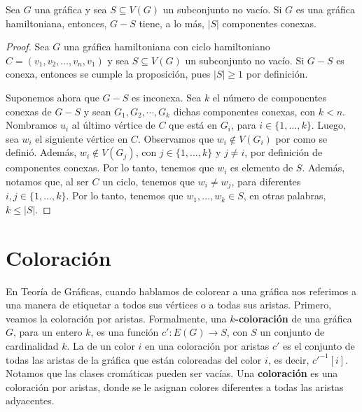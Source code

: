\begin{proposicion}
\label{prop:hamilt}
   Sea $G$ una gr\'afica y sea $S \subseteq V(G)$ un subconjunto no vac\'io. Si
    $G$ es una gr\'afica hamiltoniana, entonces, $G-S$ tiene, a lo m\'as, $|S|$
    componentes conexas.
\end{proposicion}


\begin{proof}
    Sea $G$ una gr\'afica hamiltoniana con ciclo hamiltoniano $C= (v_1, v_2,
    \dots, v_n, v_1)$ y sea $S \subseteq V(G)$ un subconjunto no vac\'io. Si
    $G-S$ es conexa, entonces se cumple la proposici\'on, pues $|S| \geq 1$ por
    definici\'on.
    
    Suponemos ahora que $G-S$ es inconexa. Sea $k$ el n\'umero de componentes
    conexas de $G-S$ y sean $G_1, G_2, \cdots, G_ k$ dichas componentes conexas,
    con $k < n$. Nombramos $u_i$ al \'ultimo v\'ertice de $C$ que est\'a en
    $G_i$, para $i \in \{1, \dots, k\}$. Luego, sea $w_i$ el siguiente v\'ertice
    en $C$. Observamos que $w_i \notin V(G_i)$ por como se defini\'o. Adem\'as,
    $w_i \notin V(G_j)$, con $j \in \{1, \dots, k\}$ y $j \neq i$, por
    definici\'on de componentes conexas. Por lo tanto, tenemos que $w_i$ es
    elemento de $S$. Adem\'as, notamos que, al ser $C$ un ciclo, tenemos que
    $w_i \neq w_j$, para diferentes $i,j \in \{1, \dots, k\}$. Por lo tanto,
    tenemos que $w_1, \dots, w_k \in S$, en otras palabras, $k \leq |S|$. 
\end{proof} 

\section{Coloraci\'on}
\label{sec:coloracion}

En Teor\'ia de Gr\'aficas, cuando hablamos de colorear a una gr\'afica nos
referimos a una manera de etiquetar a todos sus v\'ertices o a todas sus
aristas. Primero, veamos la coloraci\'on por aristas. Formalmente, una
\textbf{$k$-coloraci\'on}  de una gr\'afica $G$, para un entero $k$,
es una funci\'on $c' \colon E(G)\to S$, con $S$ un conjunto de cardinalidad $k$.
La  de un color $i$ en una coloraci\'on por aristas
$c'$ es el conjunto de todas las aristas de la gr\'afica que est\'an coloreadas
del color $i$, es decir, $c'^{-1}[i]$. Notamos que las clases crom\'aticas
pueden ser vac\'ias. Una \textbf{coloraci\'on}
 es una coloraci\'on por aristas, donde se le asignan
colores diferentes a todas las aristas adyacentes.

